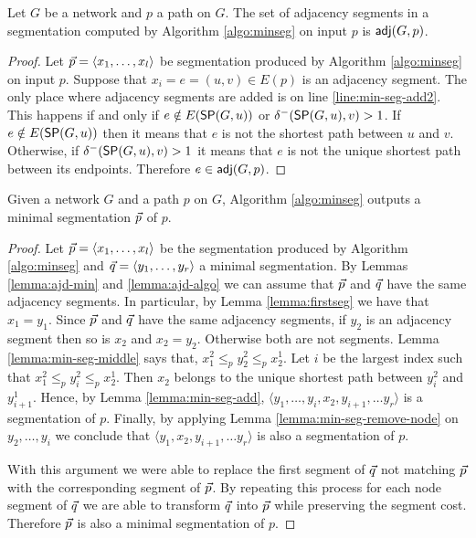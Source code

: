 \begin{lemma}
\label{lemma:ajd-algo}
Let $G$ be a network and $p$ a path on $G$. 
The set of adjacency segments in a segmentation computed by Algorithm \ref{algo:minseg} on input $p$ is $\adj(G, p)$.
\end{lemma}

\begin{proof}
Let $\sr{p} = \langle x_1, \ldots, x_l \rangle$ be segmentation produced by Algorithm \ref{algo:minseg} on input $p$.  Suppose that
$x_i = e = (u, v) \in E(p)$ is an adjacency segment. The only place where adjacency segments are added is on line \ref{line:min-seg-add2}.
This happens if and only if $e \notin E(\sp(G, u))$ or $\delta^-(\sp(G, u), v) > 1$. If $e \notin E(\sp(G, u))$ then it means that $e$ is not the shortest
path between $u$ and $v$. Otherwise, if  $\delta^-(\sp(G, u), v) > 1$ it means that $e$ is not the unique shortest path between its endpoints.
Therefore $e \in \adj(G, p)$.
\end{proof}

\begin{theorem}
Given a network $G$ and a path $p$ on $G$, Algorithm \ref{algo:minseg} outputs a minimal segmentation $\sr{p}$ of $p$.
\end{theorem}

\begin{proof}
Let $\sr{p} = \langle x_1, \ldots, x_l \rangle$ be the segmentation produced by Algorithm \ref{algo:minseg} and 
$\sr{q} = \langle y_1, \ldots, y_r \rangle$ a minimal segmentation. By Lemmas \ref{lemma:ajd-min} and \ref{lemma:ajd-algo} we can
assume that $\sr{p}$ and $\sr{q}$ have the same adjacency segments. In particular, by Lemma \ref{lemma:firstseg} we have that $x_1 = y_1$.
Since $\sr{p}$ and $\sr{q}$ have the same adjacency segments, if $y_2$ is an adjacency segment then so is $x_2$ and $x_2 = y_2$. Otherwise
both are not segments. Lemma \ref{lemma:min-seg-middle} says that, $x^2_1 \leq_p y^2_2 \leq_p x^1_2$. Let $i$ be the largest index such that
$x^2_1 \leq_p y^2_i \leq_p x^1_2$. Then $x_2$ belongs to the unique
shortest path between $y^2_i$ and $y^1_{i + 1}$. Hence, by Lemma \ref{lemma:min-seg-add},
$\langle y_1, \ldots, y_i, x_2, y_{i + 1}, \ldots y_r \rangle$ is a segmentation of $p$. Finally, by applying Lemma \ref{lemma:min-seg-remove-node} 
on $y_2, \ldots, y_i$ we conclude that $\langle y_1, x_2, y_{i + 1}, \ldots y_r \rangle$ is also a segmentation of $p$.

With this argument we were able to replace the first segment of $\sr{q}$ not matching $\sr{p}$ with the corresponding segment of $\sr{p}$.
By repeating this process for each node segment of $\sr{q}$ we are able to transform $\sr{q}$ into $\sr{p}$ while preserving the segment cost.
Therefore $\sr{p}$ is also a minimal segmentation of $p$.
\end{proof}


